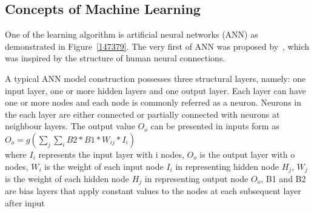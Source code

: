 \subsection{Concepts of Machine Learning}
One of the learning algorithm is artificial neural networks (ANN) as demonstrated in Figure~\ref{147379}. The very first of ANN was proposed by~\citet{McCulloch_1943}, which was inspired by the structure of human neural connections. 
\par 
A typical ANN model construction possesses three structural layers, namely: one input layer, one or more hidden layers and one output layer. Each layer can have one or more nodes and each node is commonly referred as a neuron. Neurons in the each layer are either connected or partially connected with neurons at neighbour layers. The output value $O_o$ can be presented in inputs form as
$O_o = g( \sum_{j} \sum_{i} B2*B1*W_{ij} * I_i)$ \\
where $I_i$ represents the input layer with i nodes, $O_o$ is the output layer with o nodes, $W_{i}$ is the weight of each input node $I_i$ in representing hidden node $H_j$, $W_{j}$ is the weight of each hidden node $H_j$ in representing output node $O_o$,  B1 and B2 are bias layers that apply constant values to the nodes at each subsequent layer after input 